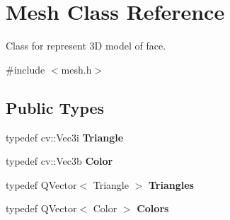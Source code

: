 \hypertarget{class_mesh}{\section{Mesh Class Reference}
\label{class_mesh}
}


Class for represent 3\+D model of face.  




{\ttfamily \#include $<$mesh.\+h$>$}

\subsection*{Public Types}
\begin{DoxyCompactItemize}
\item 
\hypertarget{class_mesh_a6fbf5a0481dcee54f0ea44363c7de2b7}{typedef cv\+::\+Vec3i {\bfseries Triangle}}\label{class_mesh_a6fbf5a0481dcee54f0ea44363c7de2b7}

\item 
\hypertarget{class_mesh_a4449aba0563ba3e8985ae1a96dbb7f06}{typedef cv\+::\+Vec3b {\bfseries Color}}\label{class_mesh_a4449aba0563ba3e8985ae1a96dbb7f06}

\item 
\hypertarget{class_mesh_ac5052738062f59eef6517606d748f804}{typedef Q\+Vector$<$ Triangle $>$ {\bfseries Triangles}}\label{class_mesh_ac5052738062f59eef6517606d748f804}

\item 
\hypertarget{class_mesh_a41a96d934a45bf52f091f33c099fbd0d}{typedef Q\+Vector$<$ Color $>$ {\bfseries Colors}}\label{class_mesh_a41a96d934a45bf52f091f33c099fbd0d}

\end{DoxyCompactItemize}
